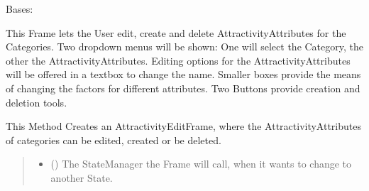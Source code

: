 \documentclass[letterpaper,10pt,english]{sphinxmanual}
\begin{document}
\begin{fulllineitems}
\label{\detokenize{apidoc/src.osm_configurator.view.toplevelframes:src.osm_configurator.view.toplevelframes.attractivity_edit_frame.AttractivityEditFrame}}
\pysigstartsignatures
{}
\pysigstopsignatures
\sphinxAtStartPar
Bases: {\hyperref[\detokenize{apidoc/src.osm_configurator.view.toplevelframes:src.osm_configurator.view.toplevelframes.top_level_frame.TopLevelFrame}]{}}

\sphinxAtStartPar
This Frame lets the User edit, create and delete Attractivity\sphinxhyphen{}Attributes for the Categories.
Two drop\sphinxhyphen{}down menus will be shown: One will select the Category, the other the Attractivity\sphinxhyphen{}Attributes.
Editing options for the Attractivity\sphinxhyphen{}Attributes will be offered in a textbox to change the name. Smaller boxes
provide the means of changing the factors for different attributes.
Two Buttons provide creation and deletion tools.

\begin{fulllineitems}
\label{\detokenize{apidoc/src.osm_configurator.view.toplevelframes:src.osm_configurator.view.toplevelframes.attractivity_edit_frame.AttractivityEditFrame.__init__}}
\pysigstartsignatures
{}
\pysigstopsignatures
\sphinxAtStartPar
This Method Creates an AttractivityEditFrame, where the Attractivity\sphinxhyphen{}Attributes of categories can be edited,
created or be deleted.
\begin{quote}\begin{description}
\begin{itemize}
\item {} 
\sphinxAtStartPar
{} ({\hyperref[\detokenize{apidoc/src.osm_configurator.view.states:src.osm_configurator.view.states.state_manager.StateManager}]{}}) \textendash{} The StateManager the Frame will call, when it wants to change to another State.


\end{itemize}
\end{description}
\end{quote}
\end{fulllineitems}
\end{fulllineitems}
\end{document}
